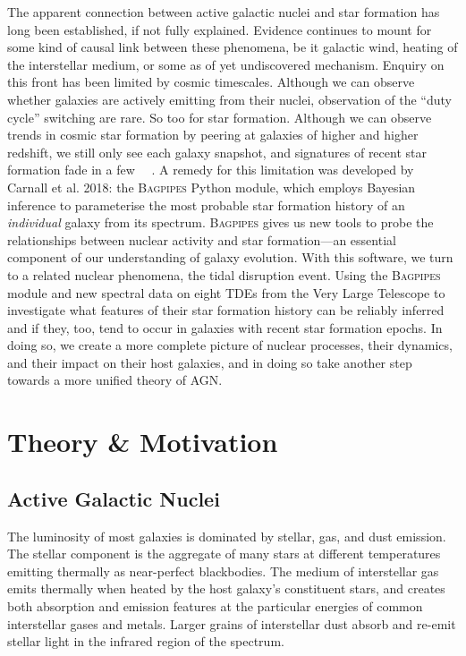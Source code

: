 \documentclass[a4paper,11pt]{article}
\begin{document}
The apparent connection between active galactic nuclei and star formation has long been established, if not fully explained. Evidence continues to mount for some kind of causal link between these phenomena, be it galactic wind, heating of the interstellar medium, or some as of yet undiscovered mechanism. Enquiry on this front has been limited by cosmic timescales. Although we can observe whether galaxies are actively emitting from their nuclei, observation of the ``duty cycle'' switching are rare.\cite{Lawrence_1987} So too for star formation. Although we can observe trends in cosmic star formation by peering at galaxies of higher and higher redshift, we still only see each galaxy snapshot, and signatures of recent star formation fade in a few \SI{}{\mega\year}. A remedy for this limitation was developed by Carnall et al. 2018: the \textsc{Bagpipes} Python module, which employs Bayesian inference to parameterise the most probable star formation history of an \textit{individual} galaxy from its spectrum.\cite{Carnall_2018} \textsc{Bagpipes} gives us new tools to probe the relationships between nuclear activity and star formation---an essential component of our understanding of galaxy evolution. With this software, we turn to a related nuclear phenomena, the tidal disruption event. Using the \textsc{Bagpipes} module and new spectral data on eight TDEs from the Very Large Telescope to investigate what features of their star formation history can be reliably inferred and if they, too, tend to occur in galaxies with recent star formation epochs. In doing so, we create a more complete picture of nuclear processes, their dynamics, and their impact on their host galaxies, and in doing so take another step towards a more unified theory of AGN.

\section{Theory \& Motivation}\label{sec:theory_and_motivation}
\subsection{Active Galactic Nuclei}\label{sec:active_galactic_nuclei}
The luminosity of most galaxies is dominated by stellar, gas, and dust emission. The stellar component is the aggregate of many stars at different temperatures emitting thermally as near-perfect blackbodies.\cite{Peterson_1997} The medium of interstellar gas emits thermally when heated by the host galaxy's constituent stars, and creates both absorption and emission features at the particular energies of common interstellar gases and metals. Larger grains of interstellar dust absorb and re-emit stellar light in the infrared region of the spectrum.\cite{Dyson_1997}
\end{document}
